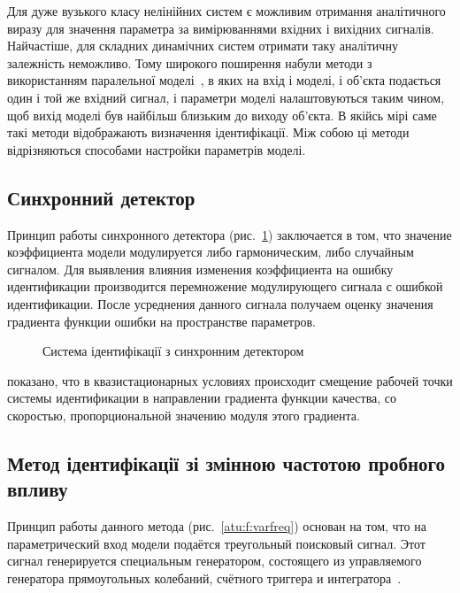 Для дуже вузького класу нелінійних систем є можливим отримання
аналітичного виразу для значення параметра за вимірюваннями
вхідних і вихідних сигналів. Найчастіше, для складних динамічних
систем отримати таку аналітичну залежність неможливо. Тому
широкого поширення набули методи з використанням паралельної
моделі~\cite{lung_id_sys, gropp_methods_id, deith_method_id_ds}, в яких на вхід і моделі,
і об'єкта подається один і той же вхідний сигнал, і параметри
моделі налаштовуються таким чином, щоб вихід моделі був
найбільш близьким до виходу об'єкта. В якійсь мірі саме такі
методи відображають визначення ідентифікації. Між собою ці
методи відрізняються способами настройки параметрів моделі.


\subsection{Синхронний детектор}%

Принцип работы синхронного детектора %
(рис.~\ref{atu:f:syncdet})
заключается в том,
что значение коэффициента модели модулируется либо гармоническим,
либо случайным сигналом. Для выявления влияния
изменения коэффициента на ошибку идентификации
производится перемножение модулирующего сигнала с ошибкой
идентификации. После усреднения данного сигнала
получаем оценку значения градиента функции ошибки на
пространстве параметров.

\begin{figure}[htb!]
\begin{center}

\end{center}
\caption{Система ідентифікації з синхронним детектором}
\label{atu:f:syncdet}
\end{figure}

показано, что в квазистационарных условиях
происходит смещение рабочей точки системы идентификации
в направлении градиента функции качества,
со скоростью, пропорциональной значению модуля этого градиента.


\subsection{Метод ідентифікації зі змінною частотою пробного впливу}%

Принцип работы данного метода
(рис.~\ref{atu:f:varfreq})
основан на том, что на параметрический вход модели подаётся треугольный поисковый сигнал.
Этот сигнал генерируется специальным генератором,
состоящего из управляемого генератора прямоугольных колебаний,
счётного триггера и интегратора~\cite{adopt_cont_sys,rastr_adop_complex_sys}.


